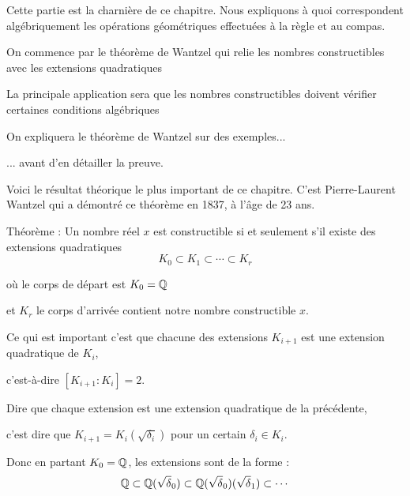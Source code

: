 



\newcommand{\construc}{\mathcal{C}}
\newcommand{\plan}{\mathcal{P}}
\newcommand{\cercle}{\mathcal{C}}



\debuttexte


\diapo

\change
Cette partie est la charnière de ce chapitre. Nous expliquons à quoi 
correspondent algébriquement les opérations géométriques effectuées à la règle et au compas.

\change
On commence par le théorème de Wantzel qui relie les nombres
constructibles avec les extensions quadratiques

\change
La principale application sera que les nombres constructibles doivent vérifier certaines conditions algébriques

\change
On expliquera le théorème de Wantzel sur des exemples...

\change
... avant d'en détailler la preuve.


\diapo

Voici le résultat théorique le plus important de ce chapitre.
C'est Pierre-Laurent Wantzel qui a démontré ce théorème en 1837, à l'âge de 23 ans.

Théorème : 
Un nombre réel $x$ est constructible si et seulement s'il existe 
des extensions quadratiques 
$$K_0 \subset K_1 \subset \cdots \subset K_r$$

où le corps de départ est $K_0 = \mathbb{Q}$ 

et $K_r$ le corps d'arrivée contient notre nombre constructible $x$.



\change
Ce qui est important c'est que chacune des extensions $K_{i+1}$ est une extension quadratique de $K_i$,

\change
c'est-à-dire $[K_{i+1}:K_i]=2$.

\change
Dire que chaque extension est une extension quadratique de la précédente,

c'est dire que $K_{i+1} = K_i(\sqrt{\delta_i})$ pour un certain $\delta_i \in K_i$. 

\change
Donc en partant $K_0 = \mathbb{Q}$, les extensions sont de la forme :
$$\mathbb{Q} \subset \mathbb{Q}(\sqrt \delta_0) \subset \mathbb{Q}(\sqrt \delta_0)(\sqrt \delta_1) \subset \cdots$$



